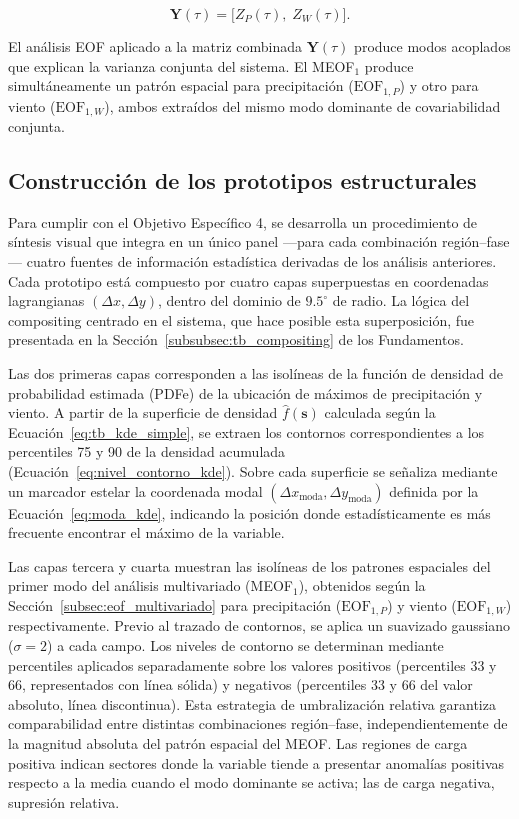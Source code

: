 \begin{equation}\label{eq:meof_vector}
    \mathbf{Y}(\tau) = \big[ Z_P(\tau),\; Z_W(\tau) \big].
\end{equation}

El análisis EOF aplicado a la matriz combinada $\mathbf{Y}(\tau)$ produce modos acoplados que explican la varianza conjunta del sistema. El MEOF$_1$ produce simultáneamente un patrón espacial para precipitación ($\text{EOF}_{1,P}$) y otro para viento ($\text{EOF}_{1,W}$), ambos extraídos del mismo modo dominante de covariabilidad conjunta.

\subsection{Construcción de los prototipos estructurales}\label{subsec:prototipos}
Para cumplir con el Objetivo Específico 4, se desarrolla un procedimiento de síntesis visual que integra en un único panel —para cada combinación región--fase— cuatro fuentes de información estadística derivadas de los análisis anteriores. Cada prototipo está compuesto por cuatro capas superpuestas en coordenadas lagrangianas $(\Delta x, \Delta y)$, dentro del dominio de $9.5^{\circ}$ de radio. La lógica del compositing centrado en el sistema, que hace posible esta superposición, fue presentada en la Sección~\ref{subsubsec:tb_compositing} de los Fundamentos.

Las dos primeras capas corresponden a las isolíneas de la función de densidad de probabilidad estimada (PDFe) de la ubicación de máximos de precipitación y viento. A partir de la superficie de densidad $\hat{f}(\mathbf{s})$ calculada según la Ecuación~\ref{eq:tb_kde_simple}, se extraen los contornos correspondientes a los percentiles 75 y 90 de la densidad acumulada (Ecuación~\ref{eq:nivel_contorno_kde}). Sobre cada superficie se señaliza mediante un marcador estelar la coordenada modal $(\Delta x_{\text{moda}}, \Delta y_{\text{moda}})$ definida por la Ecuación~\ref{eq:moda_kde}, indicando la posición donde estadísticamente es más frecuente encontrar el máximo de la variable.

Las capas tercera y cuarta muestran las isolíneas de los patrones espaciales del primer modo del análisis multivariado (MEOF$_1$), obtenidos según la Sección~\ref{subsec:eof_multivariado} para precipitación ($\text{EOF}_{1,P}$) y viento ($\text{EOF}_{1,W}$) respectivamente. Previo al trazado de contornos, se aplica un suavizado gaussiano ($\sigma = 2$) a cada campo. Los niveles de contorno se determinan mediante percentiles aplicados separadamente sobre los valores positivos (percentiles 33 y 66, representados con línea sólida) y negativos (percentiles 33 y 66 del valor absoluto, línea discontinua). Esta estrategia de umbralización relativa garantiza comparabilidad entre distintas combinaciones región--fase, independientemente de la magnitud absoluta del patrón espacial del MEOF. Las regiones de carga positiva indican sectores donde la variable tiende a presentar anomalías positivas respecto a la media cuando el modo dominante se activa; las de carga negativa, supresión relativa.

